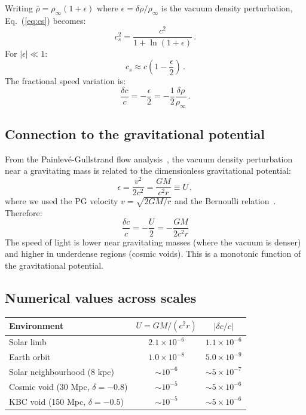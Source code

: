 \documentclass[12pt, a4paper]{article}
\newcommand{\rhob}{\bar{\rho}}
\begin{document}
Writing $\rhob = \rho_\infty(1 + \epsilon)$ where
$\epsilon = \delta\rho/\rho_\infty$ is the vacuum
density perturbation, Eq.~(\ref{eq:cs}) becomes:
\begin{equation}
    c_s^2 = \frac{c^2}{1 + \ln(1+\epsilon)}\,.
\label{eq:cs_epsilon}
\end{equation}
For $|\epsilon| \ll 1$:
\begin{equation}
    c_s \approx c\left(1 - \frac{\epsilon}{2}\right)\,.
\label{eq:cs_linear}
\end{equation}
The fractional speed variation is:
\begin{equation}
    \frac{\delta c}{c} = -\frac{\epsilon}{2}
    = -\frac{1}{2}\frac{\delta\rho}{\rho_\infty}\,.
\label{eq:dc_c}
\end{equation}

\subsection{Connection to the gravitational potential}

From the Painlev\'{e}-Gullstrand flow
analysis~\cite{kulangiev_2026a,kulangiev_2026b}, the
vacuum density perturbation near a gravitating mass is
related to the dimensionless gravitational potential:
\begin{equation}
    \epsilon = \frac{v^2}{2c^2}
    = \frac{GM}{c^2 r} \equiv U\,,
\label{eq:epsilon_U}
\end{equation}
where we used the PG velocity
$v = \sqrt{2GM/r}$ and the Bernoulli
relation~\cite{kulangiev_2026b}. Therefore:
\begin{equation}
    \boxed{\;\frac{\delta c}{c}
    = -\frac{U}{2}
    = -\frac{GM}{2c^2 r}\;}
\label{eq:dc_U}
\end{equation}
The speed of light is lower near gravitating masses
(where the vacuum is denser) and higher in underdense
regions (cosmic voids). This is a monotonic function
of the gravitational potential.

\subsection{Numerical values across scales}

\begin{center}
\begin{tabular}{lcc}
\hline
Environment & $U = GM/(c^2 r)$ & $|\delta c/c|$ \\
\hline
Solar limb & $2.1 \times 10^{-6}$ & $1.1 \times 10^{-6}$ \\
Earth orbit & $1.0 \times 10^{-8}$ & $5.0 \times 10^{-9}$ \\
Solar neighbourhood (8 kpc) & $\sim 10^{-6}$ & $\sim 5 \times 10^{-7}$ \\
Cosmic void (30 Mpc, $\delta = -0.8$) & $\sim 10^{-5}$ & $\sim 5 \times 10^{-6}$ \\
KBC void (150 Mpc, $\delta = -0.5$) & $\sim 10^{-5}$ & $\sim 5 \times 10^{-6}$ \\
\hline
\end{tabular}
\end{center}
\end{document}
